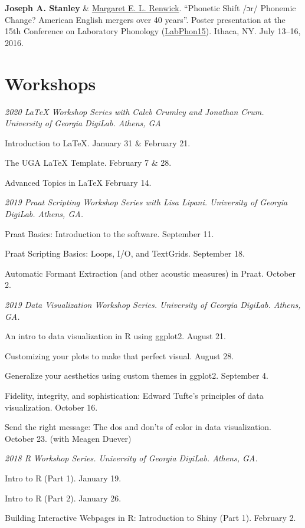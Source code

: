 \documentclass[
]{article}
\begin{document}
\textbf{Joseph A. Stanley} \&
\href{http://faculty.franklin.uga.edu/mrenwick/}{Margaret E. L.
Renwick}. ``Phonetic Shift {/ɔr/} Phonemic Change? American English
mergers over 40 years''. Poster presentation at the 15th Conference on
Laboratory Phonology (\href{http://labphon.org/labphon15/}{LabPhon15}).
Ithaca, NY. July 13--16, 2016.

\hypertarget{workshops}{%
\section{Workshops}\label{workshops}}

\emph{2020 LaTeX Workshop Series with Caleb Crumley and Jonathan Crum.
University of Georgia DigiLab. Athens, GA}

Introduction to LaTeX. January 31 \& February 21.

The UGA LaTeX Template. February 7 \& 28.

Advanced Topics in LaTeX February 14.

\emph{2019 Praat Scripting Workshop Series with Lisa Lipani. University
of Georgia DigiLab. Athens, GA.}

Praat Basics: Introduction to the software. September 11.

Praat Scripting Basics: Loops, I/O, and TextGrids. September 18.

Automatic Formant Extraction (and other acoustic measures) in Praat.
October 2.

\emph{2019 Data Visualization Workshop Series. University of Georgia
DigiLab. Athens, GA.}

An intro to data visualization in R using ggplot2. August 21.

Customizing your plots to make that perfect visual. August 28.

Generalize your aesthetics using custom themes in ggplot2. September 4.

Fidelity, integrity, and sophistication: Edward Tufte's principles of
data visualization. October 16.

Send the right message: The dos and don'ts of color in data
visualization. October 23. (with Meagen Duever)

\emph{2018 R Workshop Series. University of Georgia DigiLab. Athens,
GA.}

Intro to R (Part 1). January 19.

Intro to R (Part 2). January 26.

Building Interactive Webpages in R: Introduction to Shiny (Part 1).
February 2.
\end{document}
